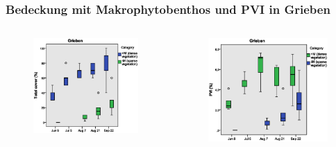 \documentclass{beamer}
\begin{document}
\begin{frame}
\frametitle{Bedeckung mit Makrophytobenthos und PVI in Grieben}
\begin{columns}
\begin{column}{5.5cm}
\begin{figure}
\includegraphics[width=\textwidth]{images/total_cover/Boxplots_G_V2.eps}
\end{figure}
\end{column}
\begin{column}{5.5cm}
\begin{figure}
\includegraphics[width=\textwidth]{images/pvi/boxplot_pvi2.eps}
\end{figure}
\end{column}
\end{columns}
\end{frame}
\end{document}
